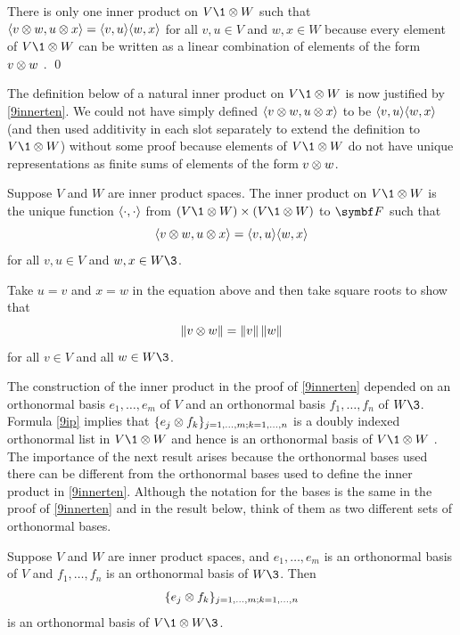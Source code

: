 There is only one inner product on $V\1 \tensor W$ such that $\langle v \otimes w, u \otimes x \rangle = \langle v, u\rangle \langle w, x\rangle$ for all $v, u \in V$ and $w, x \in W$ because every element of $V\1 \tensor W$ can be written as a linear combination of elements of the form $v \otimes w$
.
\qed

\pagebreak[3]

The definition below of a natural inner product on $V\1 \tensor W$ is now justified by \ref{9innerten}. We could not have simply defined
$\langle v \otimes w, u \otimes x \rangle$ to be $\langle v, u\rangle \langle w, x\rangle$ (and then used additivity in each slot separately to extend the definition to
$V\1 \tensor W$) without some proof because elements of $V\1 \tensor W$ do not have unique representations as finite sums of elements of the form $v \otimes w$.

{Suppose $V$ and $W$ are inner product spaces. The inner product on $V\1 \tensor W$ is the unique function $\langle\cdot, \cdot\rangle$ from $(V\1 \tensor W) \times (V\1 \tensor W)$ to $\F{}$ such that
\[
\langle v \otimes w, u \otimes x \rangle = \langle v, u\rangle \langle w, x\rangle
\]
for all $v, u \in V$ and $w, x \in W\3$.}

Take $u = v$ and $x = w$ in the equation above and then take square roots to show that
\[
\lVert v \otimes w\rVert = \lVert v\rVert \, \lVert w\rVert
\]
for all $v \in V$ and all $w \in W\3$.

The construction of the inner product in the proof of \ref{9innerten} depended on an orthonormal basis
$e_1, \ldots, e_m$ of $V$ and an orthonormal basis $f_1, \ldots, f_n$ of $W\3$. Formula \ref{9ip} implies that $\{e_j \otimes f_k\}_{j = 1, \ldots, m; k = 1, \ldots, n}$ is a doubly indexed orthonormal list in $V\1 \tensor W$ and hence is an orthonormal basis of $V\1 \tensor W$ . The importance of the next result arises because the orthonormal bases used there can be different from the orthonormal bases used to define the inner product in  \ref{9innerten}. Although the notation for the bases is the same in the proof of \ref{9innerten} and in the result below, think of them as two different sets of orthonormal bases.

{Suppose $V$ and $W$ are inner product spaces, and $e_1, \ldots, e_m$ is an orthonormal basis of $V$ and $f_1, \ldots, f_n$ is an orthonormal basis of $W\3$. Then
\[
\{e_j \otimes f_k\}_{j = 1, \ldots, m; k = 1, \ldots, n}
\]
is an orthonormal basis of $V\1 \tensor W\3$.}

